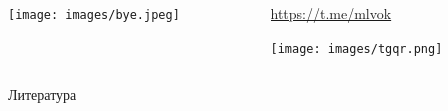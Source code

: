 \documentclass[11pt,aspectratio=169,handout]{beamer}
\begin{document}
\begin{frame}{}

\begin{columns}
\begin{column}{0.45\textwidth}
   \begin{center}
                \texttt{[image: images/bye.jpeg]}
   \end{center}
\end{column}
\begin{column}{0.45\textwidth}
   \begin{center}
                \url{https://t.me/mlvok}

                \texttt{[image: images/tgqr.png]}
   \end{center}
\end{column}
\end{columns}

\end{frame}

\begin{frame}[allowframebreaks]{Литература}




\end{frame}
\end{document}
